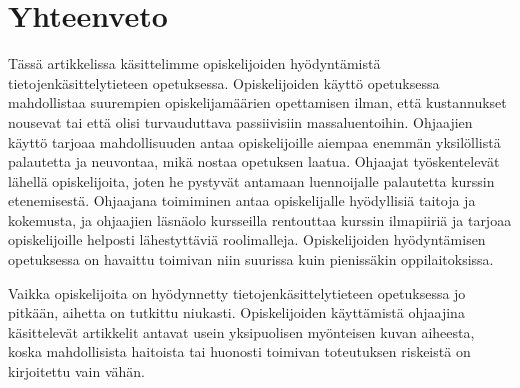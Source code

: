 \documentclass[finnish]{tktltiki2}
\theoremstyle{definition}
\theoremstyle{remark}
\begin{document}
\section{Yhteenveto}
Tässä artikkelissa käsittelimme opiskelijoiden hyödyntämistä tie\-to\-jen\-kä\-sit\-te\-ly\-tie\-teen opetuksessa. Opiskelijoiden käyttö opetuksessa mahdollistaa suurempien opiskelijamäärien opettamisen ilman, että kustannukset nousevat tai että olisi turvauduttava passiivisiin massaluentoihin. Ohjaajien käyttö tarjoaa mahdollisuuden antaa opiskelijoille aiempaa enemmän yksilöllistä palautetta ja neuvontaa, mikä nostaa opetuksen laatua. Ohjaajat työskentelevät lähellä opiskelijoita, joten he pystyvät antamaan luennoijalle palautetta kurssin etenemisestä. Ohjaajana toimiminen antaa opiskelijalle hyödyllisiä taitoja ja kokemusta, ja ohjaajien läsnäolo kursseilla rentouttaa kurssin ilmapiiriä ja tarjoaa opiskelijoille helposti lähestyttäviä roolimalleja. Opiskelijoiden hyödyntämisen opetuksessa on havaittu toimivan niin suurissa \cite{Reges03} kuin pienissäkin \cite{Dickson11} oppilaitoksissa. \par

Vaikka opiskelijoita on hyödynnetty tietojenkäsittelytieteen opetuksessa jo pitkään, aihetta on tutkittu niukasti. Opiskelijoiden käyttämistä ohjaajina käsittelevät artikkelit antavat usein yksipuolisen myönteisen kuvan aiheesta, koska mahdollisista haitoista tai huonosti toimivan toteutuksen riskeistä on kirjoitettu vain vähän.  \par



\end{document}
